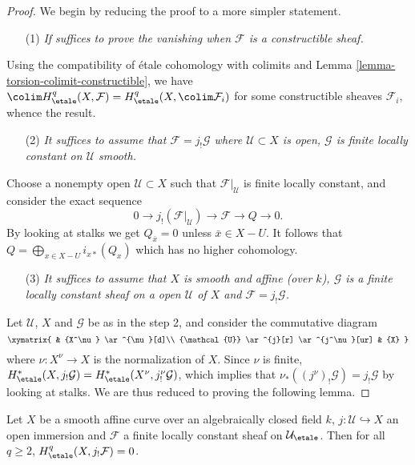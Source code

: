 \begin{proof}
We begin by reducing the proof to a more simpler statement.
\begin{enumerate}
\item[(1)] {\it If suffices to prove the vanishing when $\mathcal{F}$
is a constructible sheaf.}
\end{enumerate}

\noindent
Using the compatibility of \'etale cohomology with colimits and
Lemma \ref{lemma-torsion-colimit-constructible},
we have $\colim H_\etale^q(X, \mathcal{F}) =
H_\etale^q(X, \colim \mathcal{F}_i)$ for some
constructible sheaves $\mathcal{F}_i$, whence the result.

\begin{enumerate}
\item[(2)]
{\it It suffices to assume that $\mathcal{F} = j_!\mathcal{G}$ where
$\mathcal{U}\subset X$ is open, $\mathcal{G}$ is finite locally constant on
$\mathcal{U}$ smooth.}
\end{enumerate}

\noindent
Choose a nonempty open $\mathcal{U}\subset X$ such that
$\mathcal{F}|_\mathcal{U}$ is finite locally constant, and consider the exact
sequence
$$
0\to j_!(\mathcal{F}|_\mathcal{U})\to \mathcal{F}\to Q\to 0.
$$
By looking at stalks we get $Q_{\bar x}=0$ unless $\bar x\in X-U$. It follows
that $\displaystyle Q = \bigoplus_{x\in X-U} i_{x*} (Q_x)$
which has no higher cohomology.

\begin{enumerate}
\item[(3)]
{\it It suffices to assume that $X$ is smooth and affine (over $k$),
$\mathcal{G}$ is a finite locally constant sheaf on a open $\mathcal{U}$ of $X$
and $\mathcal{F} = j_!\mathcal{G}$.}
\end{enumerate}

\noindent
Let $\mathcal{U}$, $X$ and $\mathcal{G}$ be as in the step 2, and consider the
commutative diagram
$$
\xymatrix{
& {X^\nu} \ar^{\nu}[d]\\
{\mathcal{U}} \ar^{j}[r] \ar^{j^\nu}[ur] & {X}
}
$$
where $\nu: X^\nu \to X$ is the normalization of $X$. Since $\nu$ is finite,
$H_\etale^*(X, j_!\mathcal{G}) =
H_\etale^*(X^\nu, j^\nu_!\mathcal{G})$, which
implies that $\nu_*((j^\nu)_!\mathcal{G}) = j_!\mathcal{G}$ by looking at
stalks. We are thus reduced to proving the following lemma.
\end{proof}

\begin{lemma}
\label{lemma-vanishing-easier}
Let $X$ be a smooth affine curve over an algebraically closed field $k$, $j:
\mathcal{U} \hookrightarrow X$ an open immersion and $\mathcal{F}$ a finite
locally constant sheaf on $\mathcal{U}_\etale$. Then for all
$q \geq 2$, $H_\etale^q(X, j_! \mathcal{F}) = 0$.
\end{lemma}

